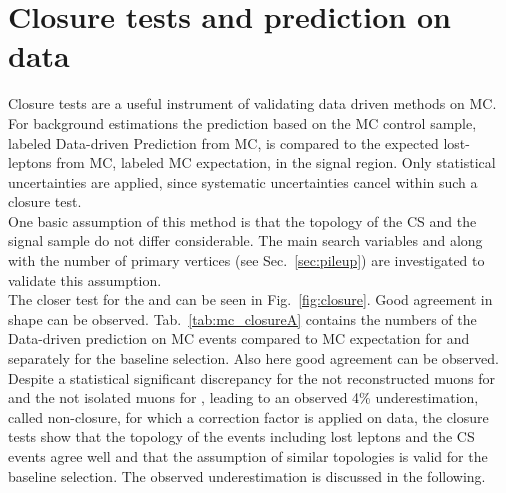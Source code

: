 \section{Closure tests and prediction on data}
\label{sec:closure_test}
Closure tests are a useful instrument of validating data driven methods on MC. For background estimations the prediction based on the MC control sample, labeled Data-driven Prediction from MC, is compared to the expected lost-leptons from MC, labeled MC expectation, in the signal region. Only statistical uncertainties are applied, since systematic uncertainties cancel within such a closure test.\\
One basic assumption of this method is that the topology of the CS and the signal sample do not differ considerable. The main search variables \HT and \MHT along with the number of primary vertices (see Sec.~\ref{sec:pileup})  are investigated to validate this assumption.\\ 
The closer test for the \HT and \MHT can be seen in Fig.~\ref{fig:closure}. Good agreement in shape can be observed. Tab.~\ref{tab:mc_closureA} contains the numbers of the Data-driven prediction on MC events compared to MC expectation for \ttbar and \wpj separately for the baseline selection. Also here good agreement can be observed. Despite a statistical significant discrepancy for the not reconstructed muons for \wpj and the not isolated muons for \ttbar, leading to an observed 4\% underestimation, called non-closure, for which a correction factor is applied on data, the closure tests show that the topology of the events including lost leptons and the CS events agree well and that the assumption of similar topologies is valid for the baseline selection. The observed underestimation is discussed in the following.\\
